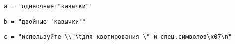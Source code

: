 
\verb|a = 'одиночные "кавычки"'|

\verb|b = "двойные 'кавычки'"|

\verb|c = "используйте \\"\tдля квотирования \" и спец.символов\x07\n"|
